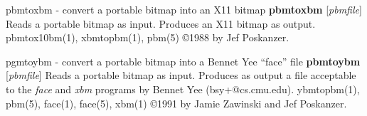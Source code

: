 %

\newpage
%

pbmtoxbm - convert a portable bitmap into an X11 bitmap
{\bf pbmtoxbm}
{\rm [}{\it pbmfile}{\rm ]}
Reads a portable bitmap as input.
Produces an X11 bitmap as output.
pbmtox10bm(1), xbmtopbm(1), pbm(5)
\copyright 1988 by Jef Poskanzer.
%
 
%

\newpage
%

pgmtoybm - convert a portable bitmap into a Bennet Yee ``face'' file
{\bf pbmtoybm}
{\rm [}{\it pbmfile}{\rm ]}
Reads a portable bitmap as input.
Produces as output a file acceptable to the
{\it face}
and
{\it xbm}
programs by Bennet Yee (bsy+@cs.cmu.edu).
ybmtopbm(1), pbm(5), face(1), face(5), xbm(1)
\copyright 1991 by Jamie Zawinski and Jef Poskanzer.
%
 
